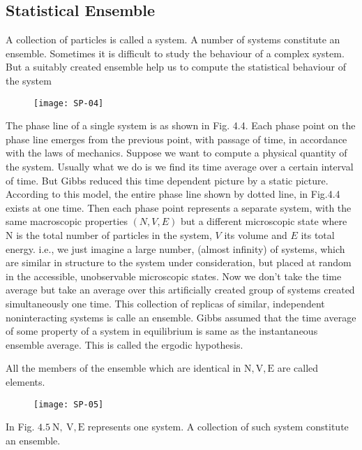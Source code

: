 \subsection{Statistical Ensemble}
A collection of particles is called a system. A number of systems constitute an ensemble. Sometimes it is difficult to study the behaviour of a complex system. But a suitably created ensemble help us to compute the statistical behaviour of the system
\begin{figure}[H]
	\centering
	\texttt{[image: SP-04]}
\end{figure}
The phase line of a single system is as shown in Fig. 4.4. Each phase point on the phase line emerges from the previous point, with passage of time, in accordance with the laws of mechanics. Suppose we want to compute a physical quantity of the system. Usually what we do is we find its time average over a certain interval of time. But Gibbs reduced this time dependent picture by a static picture. According to this model, the entire phase line shown by dotted line, in Fig.4.4 exists at one time. Then each phase point represents a separate system, with the same macroscopic properties $(N, V, E)$ but a different microscopic state where $\mathrm{N}$ is the total number of particles in the system, $V$ its volume and $E$ its total energy. i.e., we just imagine a large number, (almost infinity) of systems, which are similar in structure to the system under consideration, but placed at random in the accessible, unobservable microscopic states. Now we don't take the time average but take an average over this artificially created group of systems created simultaneously one time. This collection of replicas of similar, independent noninteracting systems is calle an ensemble. Gibbs assumed that the time average of some property of a system in equilibrium is same as the instantaneous ensemble average. This is called the ergodic hypothesis.

All the members of the ensemble which are identical in $\mathrm{N}, \mathrm{V}, \mathrm{E}$ are called elements.
\begin{figure}[H]
	\centering
	\texttt{[image: SP-05]}
\end{figure}
In Fig. $4.5 \mathrm{~N}, \mathrm{~V}, \mathrm{E}$ represents one system. A collection of such system constitute an ensemble.
